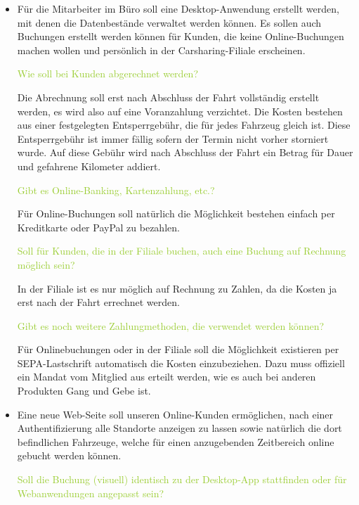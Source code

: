 \begin{itemize}
    \item Für die Mitarbeiter im Büro soll eine Desktop-Anwendung erstellt werden, mit denen die Datenbestände verwaltet werden können. Es sollen auch Buchungen erstellt werden können für Kunden, die keine Online-Buchungen machen wollen und persönlich in der Carsharing-Filiale erscheinen. 

    \textcolor{YellowGreen}{Wie soll bei Kunden abgerechnet werden?}

    \textcolor{NavyBlue}{Die Abrechnung soll erst nach Abschluss der Fahrt vollständig erstellt werden, es wird also auf eine Voranzahlung verzichtet. Die Kosten bestehen aus einer festgelegten Entsperrgebühr, die für jedes Fahrzeug gleich ist. Diese Entsperrgebühr ist immer fällig sofern der Termin nicht vorher storniert wurde. Auf diese Gebühr wird nach Abschluss der Fahrt ein Betrag für Dauer und gefahrene Kilometer addiert.}

    \textcolor{YellowGreen}{Gibt es Online-Banking, Kartenzahlung, etc.?}

    \textcolor{NavyBlue}{Für Online-Buchungen soll natürlich die Möglichkeit bestehen einfach per Kreditkarte oder PayPal zu bezahlen.}

    \textcolor{YellowGreen}{Soll für Kunden, die in der Filiale buchen, auch eine Buchung auf Rechnung möglich sein?}

    \textcolor{NavyBlue}{ In der Filiale ist es nur möglich auf Rechnung zu Zahlen, da die Kosten ja erst nach der Fahrt errechnet werden. }

    \textcolor{YellowGreen}{Gibt es noch weitere Zahlungmethoden, die verwendet werden können?}

    \textcolor{NavyBlue}{Für Onlinebuchungen oder in der Filiale soll die Möglichkeit existieren per SEPA-Lastschrift automatisch die Kosten einzubeziehen. Dazu muss offiziell ein Mandat vom Mitglied aus erteilt werden, wie es auch bei anderen Produkten Gang und Gebe ist.}

    \item Eine neue Web-Seite soll unseren Online-Kunden ermöglichen, nach einer Authentifizierung alle Standorte anzeigen zu lassen sowie natürlich die dort befindlichen Fahrzeuge, welche für einen anzugebenden Zeitbereich online gebucht werden können. 
    
    \textcolor{YellowGreen}{Soll die Buchung (visuell) identisch zu der Desktop-App stattfinden oder für Webanwendungen angepasst sein?}


\end{itemize}
